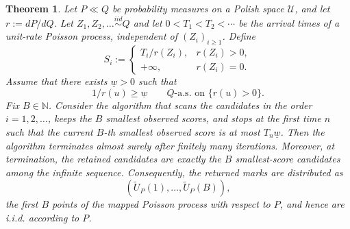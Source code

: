 \documentclass{article}
\theoremstyle{plain}
\newtheorem{theorem}{Theorem}[section]
\theoremstyle{definition}
\begin{document}
\begin{theorem}
Let $P\ll Q$ be probability measures on a Polish space $\mathcal U$, and let
$r:=dP/dQ$. Let $Z_1,Z_2,\ldots\stackrel{iid}{\sim} Q$ and let
$0<T_1<T_2<\cdots$ be the arrival times of a unit-rate Poisson process,
independent of $(Z_i)_{i\ge1}$. Define
\[
S_i :=
\begin{cases}
T_i/r(Z_i), & r(Z_i)>0,\\
+\infty, & r(Z_i)=0.
\end{cases}
\]
Assume that there exists $\underline w>0$ such that
\[
1/r(u)\ge \underline w
\qquad Q\text{-a.s. on }\{r(u)>0\}.
\] 
Fix $B\in\mathbb N$. Consider the algorithm that scans the candidates in
the order $i=1,2,\ldots$, keeps the $B$ smallest observed scores, and stops
at the first time $n$ such that the current $B$-th smallest observed score
is at most $T_n\underline w$. Then the algorithm terminates almost surely
after finitely many iterations. Moreover, at termination, the retained
candidates are exactly the $B$ smallest-score candidates among the infinite
sequence. Consequently, the returned marks are distributed as
\[
(\widetilde U_P(1),\ldots,\widetilde U_P(B)),
\]
the first $B$ points of the mapped Poisson process with respect to $P$,
and hence are i.i.d. according to $P$.
\end{theorem}
\end{document}
